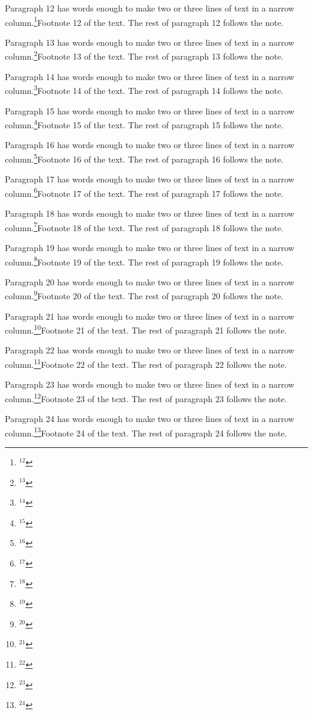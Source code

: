 Paragraph 12 has words enough to make two or three lines of text in a narrow column.\footnote{$^{12}$}{Footnote 12 of the text.} The rest of paragraph 12 follows the note.\par
Paragraph 13 has words enough to make two or three lines of text in a narrow column.\footnote{$^{13}$}{Footnote 13 of the text.} The rest of paragraph 13 follows the note.\par
Paragraph 14 has words enough to make two or three lines of text in a narrow column.\footnote{$^{14}$}{Footnote 14 of the text.} The rest of paragraph 14 follows the note.\par
Paragraph 15 has words enough to make two or three lines of text in a narrow column.\footnote{$^{15}$}{Footnote 15 of the text.} The rest of paragraph 15 follows the note.\par
Paragraph 16 has words enough to make two or three lines of text in a narrow column.\footnote{$^{16}$}{Footnote 16 of the text.} The rest of paragraph 16 follows the note.\par
Paragraph 17 has words enough to make two or three lines of text in a narrow column.\footnote{$^{17}$}{Footnote 17 of the text.} The rest of paragraph 17 follows the note.\par
Paragraph 18 has words enough to make two or three lines of text in a narrow column.\footnote{$^{18}$}{Footnote 18 of the text.} The rest of paragraph 18 follows the note.\par
Paragraph 19 has words enough to make two or three lines of text in a narrow column.\footnote{$^{19}$}{Footnote 19 of the text.} The rest of paragraph 19 follows the note.\par
Paragraph 20 has words enough to make two or three lines of text in a narrow column.\footnote{$^{20}$}{Footnote 20 of the text.} The rest of paragraph 20 follows the note.\par
Paragraph 21 has words enough to make two or three lines of text in a narrow column.\footnote{$^{21}$}{Footnote 21 of the text.} The rest of paragraph 21 follows the note.\par
Paragraph 22 has words enough to make two or three lines of text in a narrow column.\footnote{$^{22}$}{Footnote 22 of the text.} The rest of paragraph 22 follows the note.\par
Paragraph 23 has words enough to make two or three lines of text in a narrow column.\footnote{$^{23}$}{Footnote 23 of the text.} The rest of paragraph 23 follows the note.\par
Paragraph 24 has words enough to make two or three lines of text in a narrow column.\footnote{$^{24}$}{Footnote 24 of the text.} The rest of paragraph 24 follows the note.\par

